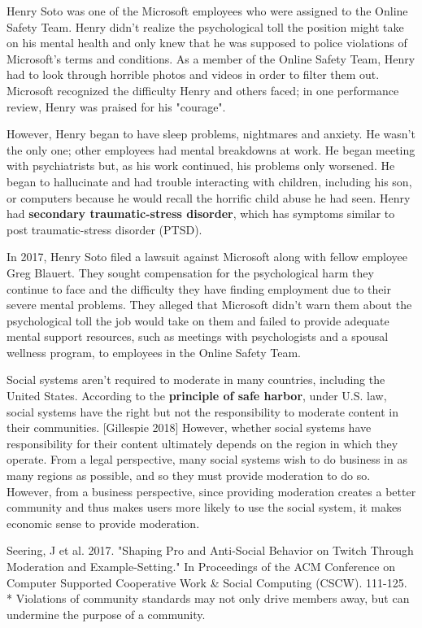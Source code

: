 \documentclass[class=book, crop=false]{standalone}
\providecommand{\keyterm}[1]{\textbf{#1}\marginnote{\scriptsize \textbf{#1}}}
\begin{document}
Henry Soto was one of the Microsoft employees who were assigned to the Online Safety Team. Henry didn't realize the psychological toll the position might take on his mental health and only knew that he was supposed to police violations of Microsoft's terms and conditions. As a member of the Online Safety Team, Henry had to look through horrible photos and videos in order to filter them out. Microsoft recognized the difficulty Henry and others faced; in one performance review, Henry was praised for his "courage".

However, Henry began to have sleep problems, nightmares and anxiety. He wasn't the only one; other employees had mental breakdowns at work. He began meeting with psychiatrists but, as his work continued, his problems only worsened. He began to hallucinate and had trouble interacting with children, including his son, or computers because he would recall the horrific child abuse he had seen. Henry had \keyterm{secondary traumatic-stress disorder}, which has symptoms similar to post traumatic-stress disorder (PTSD). 

In 2017, Henry Soto filed a lawsuit against Microsoft along with fellow employee Greg Blauert. They sought compensation for the psychological harm they continue to face and the difficulty they have finding employment due to their severe mental problems. They alleged that Microsoft didn't warn them about the psychological toll the job would take on them and failed to provide adequate mental support resources, such as meetings with psychologists and a spousal wellness program, to employees in the Online Safety Team.

Social systems aren't required to moderate in many countries, including the United States. According to the \keyterm{principle of safe harbor}, under U.S. law, social systems have the right but not the responsibility to moderate content in their communities. [Gillespie 2018] However, whether social systems have responsibility for their content ultimately depends on the region in which they operate. From a legal perspective, many social systems wish to do business in as many regions as possible, and so they must provide moderation to do so. However, from a business perspective, since providing moderation creates a better community and thus makes users more likely to use the social system, it makes economic sense to provide moderation.

Seering, J et al. 2017. "Shaping Pro and Anti-Social Behavior on Twitch Through Moderation and Example-Setting." In Proceedings of the ACM Conference on Computer Supported Cooperative Work \& Social Computing (CSCW). 111-125.\\
 * Violations of community standards may not only drive members away, but can undermine the purpose of a community.
\end{document}
